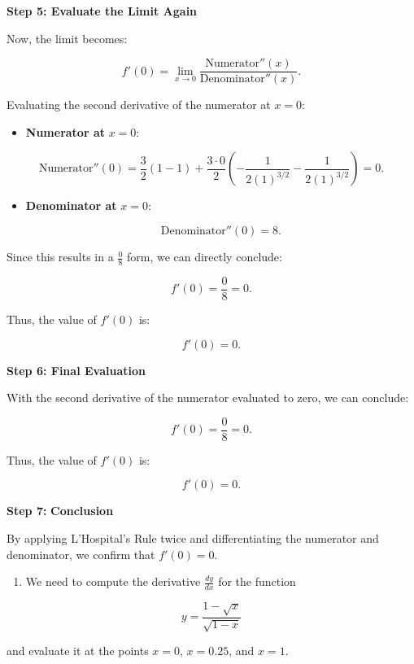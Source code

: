 \documentclass[
]{book}
\providecommand{\tightlist}{%
  \setlength{\itemsep}{0pt}\setlength{\parskip}{0pt}}
\begin{document}
\textbf{Step 5: Evaluate the Limit Again}

Now, the limit becomes:

\[
f'(0) = \lim_{x \to 0} \frac{\text{Numerator}''(x)}{\text{Denominator}''(x)}.
\]

Evaluating the second derivative of the numerator at \(x = 0\):

\begin{itemize}
\tightlist
\item
  \textbf{Numerator at} \(x = 0\):
\end{itemize}

\[
      \text{Numerator}''(0) = \frac{3}{2} \left( 1 - 1 \right) + \frac{3 \cdot 0}{2} \left( -\frac{1}{2(1)^{3/2}} - \frac{1}{2(1)^{3/2}} \right) = 0.
  \]

\begin{itemize}
\item
  \textbf{Denominator at} \(x = 0\):

  \[
   \text{Denominator}''(0) = 8.
   \]
\end{itemize}

Since this results in a \(\frac{0}{8}\) form, we can directly conclude:

\[
f'(0) = \frac{0}{8} = 0.
\]

Thus, the value of \(f'(0)\) is:

\[
f'(0) = 0.
\]

\textbf{Step 6: Final Evaluation}

With the second derivative of the numerator evaluated to zero, we can
conclude:

\[
f'(0) = \frac{0}{8} = 0.
\]

Thus, the value of \(f'(0)\) is:

\[
f'(0) = 0.
\]

\textbf{Step 7:} \textbf{Conclusion}

By applying L'Hospital's Rule twice and differentiating the numerator
and denominator, we confirm that \(f'(0) = 0\).

\begin{enumerate}
\def\labelenumi{\arabic{enumi}.}
\setcounter{enumi}{6}
\tightlist
\item
  We need to compute the derivative \(\frac{dy}{dx}\) for the function
\end{enumerate}

\[
y = \frac{1 - \sqrt{x}}{\sqrt{1 - x}}
\]

and evaluate it at the points \(x = 0\), \(x = 0.25\), and \(x = 1\).
\end{document}
